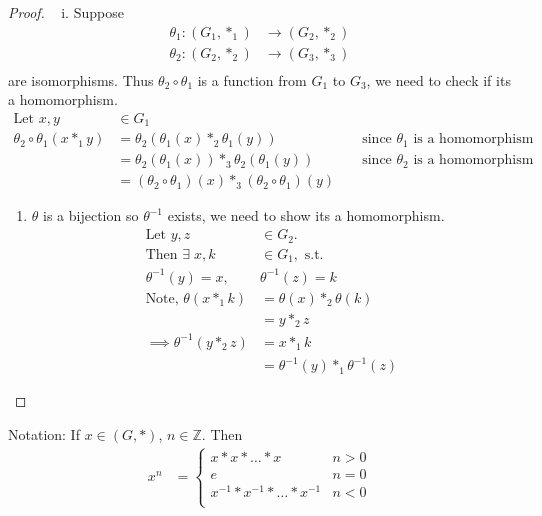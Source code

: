 \begin{proof}

~
i. Suppose
\begin{align*}
    \theta_1 : (G_1, *_1) &\to (G_2, *_2) \\
    \theta_2 : (G_2, *_2) &\to (G_3, *_3) \\
\end{align*}
are isomorphisms.
Thus \(\theta_2 \circ \theta_1\) is a function from \(G_1\) to \(G_3\), we need to check if its a homomorphism.
\begin{align*}
    \text{Let } x, y &\in G_1 && \\
    \theta_2 \circ \theta_1 (x *_1 y) &= \theta_2(\theta_1(x) *_2 \theta_1(y)) & &\text{ since $\theta_1$ is a homomorphism} \\
    &= \theta_2(\theta_1(x)) *_3 \theta_2(\theta_1(y)) & &\text{ since $\theta_2$ is a homomorphism} \\
    &= (\theta_2 \circ \theta_1)(x) *_3 (\theta_2 \circ \theta_1)(y) &&
\end{align*}

\begin{enumerate}
\def\labelenumi{\roman{enumi}.}
\setcounter{enumi}{1}
\tightlist
\item
  \(\theta\) is a bijection so \(\theta^{-1}\) exists, we need to show its a homomorphism.
  \begin{align*}
  \text{Let } y, z &\in G_2. \\
  \text{Then } \exists \; x, k &\in G_1, \text{ s.t.} \\
  \theta^{-1}(y) = x,\ &\theta^{-1}(z) = k \\
  \text{Note, } \theta(x *_1 k) &= \theta(x) *_2 \theta(k) \\
  &= y *_2 z \\
  \implies \theta^{-1}(y *_2 z) &= x *_1 k \\
  &= \theta^{-1}(y) *_1 \theta^{-1}(z)
  \end{align*}
\end{enumerate}

\end{proof}

Notation: If \(x \in (G, *)\), \(n \in \mathbb{Z}\).
Then
\begin{align*}
    x^n &= \begin{cases}
        x * x * \ldots * x & n > 0 \\
        e & n = 0 \\
        x^{-1} * x^{-1} * \ldots * x^{-1} & n < 0 \\
    \end{cases}
\end{align*}

